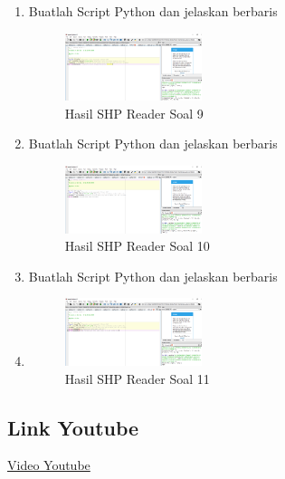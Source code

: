 \begin{enumerate}
    \item Buatlah Script Python dan jelaskan berbaris
    
    \hfill\break
    \begin{figure}[H]
		\includegraphics[width=4cm]{figures/1174008/3/soal9.PNG}
		\centering
		\caption{Hasil SHP Reader Soal 9}
    \end{figure}

    \item Buatlah Script Python dan jelaskan berbaris
    
    \hfill\break
    \begin{figure}[H]
		\includegraphics[width=4cm]{figures/1174008/3/soal10.PNG}
		\centering
		\caption{Hasil SHP Reader Soal 10}
    \end{figure}

    \item Buatlah Script Python dan jelaskan berbaris
    \item 
    \hfill\break
    \begin{figure}[H]
		\includegraphics[width=4cm]{figures/1174008/3/soal11.PNG}
		\centering
		\caption{Hasil SHP Reader Soal 11}
    \end{figure}
\end{enumerate}
\subsection{Link Youtube}
\href{https://www.youtube.com/watch?v=0LQQ3pV4wUI&feature=youtu.be}{Video Youtube}